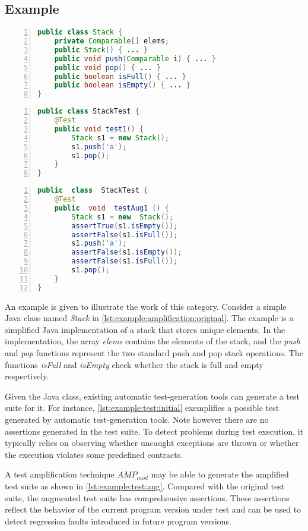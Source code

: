 \subsection{Example}
\label{subsec:sota:category-4:example}

\begin{lstlisting}[caption={Example of a toy class},label=lst:example:amplification:original,float,language=java,numbers=left]
public class Stack {
	private Comparable[] elems;
	public Stack() { ... }
	public void push(Comparable i) { ... }
	public void pop() { ... }
	public boolean isFull() { ... }
	public boolean isEmpty() { ... }
}
\end{lstlisting}

\begin{lstlisting}[caption={Initial test suite for the toy class},label=lst:example:test:initial,float,language=java,numbers=left]
public class StackTest {
	@Test
	public void test1() {  
		Stack s1 = new Stack();
		s1.push('a');
		s1.pop();
	}
}
\end{lstlisting}

\begin{lstlisting}[caption={Augmented test suite for the toy class},label=lst:example:test:aug,float,language=java,numbers=left]
public  class  StackTest {
	@Test
	public  void  testAug1 () {
		Stack s1 = new  Stack();
		assertTrue(s1.isEmpty());
		assertFalse(s1.isFull());
		s1.push('a');
		assertFalse(s1.isEmpty());
		assertFalse(s1.isFull());
		s1.pop();
	}
}
\end{lstlisting}

An example is given to illustrate the work of this category. 
Consider a simple Java class named \emph{Stack} in \autoref{lst:example:amplification:original}. 
The example is a simplified Java implementation of a stack that stores unique elements. 
In the implementation, the array \emph{elems} contains the elements of the stack, and the \emph{push} and \emph{pop} functions represent the two standard push and pop stack operations. 
The functions \emph{isFull} and \emph{isEmpty} check whether the stack is full and empty respectively.

Given the Java class, existing automatic test-generation tools can generate a test suite for it.
For instance, \autoref{lst:example:test:initial} exemplifies a possible test generated by automatic test-generation tools. 
Note however there are no assertions generated in the test suite. 
To detect problems during test execution, it typically relies on observing whether uncaught exceptions are thrown or whether the execution violates some predefined contracts. 

A test amplification technique $AMP_{mod}$ may be able to generate the amplified test suite as shown in \autoref{lst:example:test:aug}.
Compared with the original test suite, the augmented test suite has comprehensive assertions. 
These assertions reflect the behavior of the current program version under test and can be used to detect regression faults introduced in future program versions.
